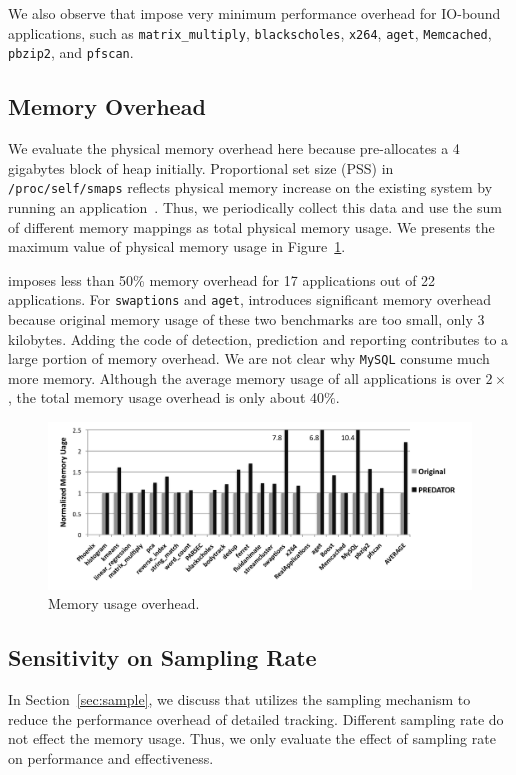We also observe that \Predator{} impose very minimum performance overhead for IO-bound applications, such as \texttt{matrix\_multiply}, \texttt{blackscholes}, \texttt{x264}, \texttt{aget}, \texttt{Memcached}, \texttt{pbzip2}, and \texttt{pfscan}.  

\subsection{Memory Overhead}
\label{sec:memoverhead}
We evaluate the physical memory overhead here because \Predator{} pre-allocates a 4 gigabytes block of heap initially. Proportional set size (PSS) in \texttt{/proc/self/smaps} reflects physical memory increase on the existing system by running an application~\cite{memusage}. Thus, we periodically collect this data and use the sum of different memory mappings as total physical memory usage. We presents the maximum value of physical memory usage in Figure~\ref{fig:memusage}. 

\Predator{} imposes less than 50\% memory overhead for 17 applications out of 22 applications.  For \texttt{swaptions} and \texttt{aget}, \Predator{} introduces significant memory overhead because original memory usage of these two benchmarks are too small, only $3$ kilobytes. Adding the code of detection, prediction and reporting contributes to a large portion of memory overhead. We are not clear why \texttt{MySQL} consume much more memory. Although the average memory usage of all applications is over $2\times$, the total memory usage overhead is only about $40\%$. 

\begin{figure}
\begin{center} 
\includegraphics[width=6.5in]{fig/memusage}
\end{center}
\caption{Memory usage overhead.}
\label{fig:memusage}
\end{figure}


\subsection{Sensitivity on Sampling Rate}
\label{sec:sensitivity}
In Section~\ref{sec:sample}, we discuss that \Predator{} utilizes the sampling mechanism to reduce the performance overhead of detailed tracking. Different sampling rate do not effect the memory usage. Thus, we only evaluate the effect of sampling rate on performance and effectiveness. 


